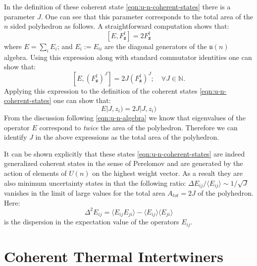 \documentclass[twocolumn,draft,aps,nofootinbib,nobibnotes,final]{revtex4-2}
\newcommand{\bz}{\mathbf{z}}
\newcommand{\mf}[1]{\mathfrak{#1}}
\newcommand{\expect}[1]{\langle #1\rangle}
\newcommand{\bket}[1]{\vert #1 )}
\begin{document}
In the definition of these coherent state \eqref{eqn:u-n-coherent-states} there is a parameter $ J $. One can see that this parameter corresponds to the total area of the $ n $ sided polyhedron as follows. A straightforward computation shows that:
\begin{equation}\label{eqn:e-f-commutator}
	[E, F^\dag_\bz] = 2 F^\dag_\bz
\end{equation}
where $ E = \sum_i E_i $; and $ E_i := E_{ii} $ are the diagonal generators of the $ \mf{u}(n) $ algebra. Using this expression along with standard commutator identities one can show that:
\begin{equation}\label{eqn:e-f-commutator-v2}
	[E, (F^\dag_\bz)^J] = 2 J (F^\dag_\bz)^J; \quad \forall J \in \mathbb{N}.
\end{equation}
Applying this expression to the definition of the coherent states \eqref{eqn:u-n-coherent-states} one can show that:
\begin{equation}\label{eqn:e-eigenvalue}
	E \bket{J, z_i} = 2 J \bket{J, z_i}
\end{equation}
From the discussion following \eqref{eqn:u-n-algebra} we know that eigenvalues of the operator $ E $ correspond to \textit{twice} the area of the polyhedron. Therefore we can identify $ J $ in the above expressions as the total area of the polyhedron.

It can be shown explicitly \cite{Freidel2010UN-Coherent} that these states \eqref{eqn:u-n-coherent-states} are indeed generalized coherent states in the sense of Perelomov \cite{Perelomov1977Generalized} and are generated by the action of elements of $ U(n) $ on the highest weight vector. As a result they are also minimum uncertainty states in that the following ratio: $ \Delta E_{ij}/\expect{E_{ij}} \sim 1/\sqrt{J} $ vanishes in the limit of large values for the total area $ A_{tot} = 2 J  $ of the polyhedron. Here:
\begin{equation}\label{eqn:e-op-uncertainty}
	\Delta^2 E_{ij} = \expect{E_{ij}E_{ji}} - \expect{E_{ij}} \expect{E_{ji}}
\end{equation}
is the dispersion in the expectation value of the operators $ E_{ij} $.

\section{Coherent Thermal Intertwiners}\label{sec:thermal-intertwiners}
\end{document}
